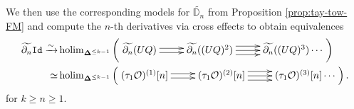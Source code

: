 \documentclass[11pt]{amsart}
\theoremstyle{definition}
\theoremstyle{remark}
\newcommand{\holim}{\operatorname{holim}}
\newcommand{\Id}{\mathtt{Id}}
\newcommand{\Cal}[1]{\mathcal{#1}}
\newcommand{\bdel}{\mathbf{\Delta}}
\begin{document}
 We then use the corresponding models for $\widetilde{\mathbb{D}_n}$ from Proposition \ref{prop:tay-tow-FM} and compute the $n$-th derivatives via cross effects to obtain equivalences \begin{align} \label{eq:model-for-nth-deriv}
    \widetilde{\partial_n} \Id \xrightarrow{\sim} & 
    \holim_{\bdel^{\leq k-1}} \left( \xymatrix{
    \widetilde{\partial_n} (UQ) \ar@<-.5ex>[r] \ar@<.5ex>[r] &
    \widetilde{\partial_n} ((UQ)^2) \ar@<-1ex>[r] \ar[r] \ar@<1ex>[r] & 
    \widetilde{\partial_n} ((UQ)^3) \cdots
    }\right) 
    \\
    \simeq & \holim_{\bdel^{\leq k-1}} \left(\xymatrix{ 
     (\tau_1\Cal{O})^{(1)}[n] \ar@<.5 ex>[r] \ar@<-.5ex>[r] &
    (\tau_1\Cal{O})^{(2)}[n] \ar@<1 ex>[r] \ar[r] \ar@<-1 ex>[r] &
    (\tau_1\Cal{O})^{(3)}[n] \cdots }\right). \nonumber
\end{align}
for $k\geq n\geq 1$.
\end{document}

